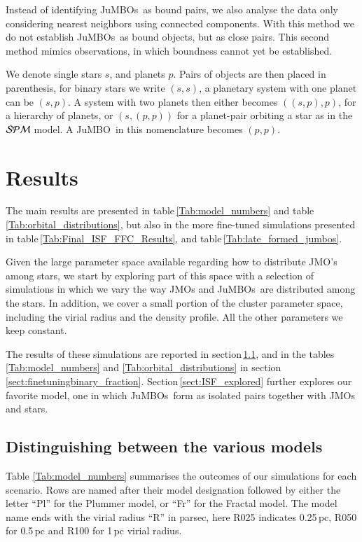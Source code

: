 \documentclass[submission,phys]{lib/SciPost}
\newcommand{\jumbo}{\mbox{JuMBO}}
\newcommand{\jumbos}{\mbox{JuMBOs}}
\begin{document}
Instead of identifying \jumbos\, as bound pairs, we also analyse the
data only considering nearest neighbors using connected components. With
this method we do not establish \jumbos\, as bound objects, but as
close pairs. This second method mimics observations, in which
boundness cannot yet be established.

We denote single stars $s$, and planets $p$. Pairs of objects are then
placed in parenthesis, for binary stars we write $(s,s)$, a planetary
system with one planet can be $(s,p)$.  A system with two planets then
either becomes $((s,p),p)$, for a hierarchy of planets, or $(s,(p,p))$
for a planet-pair orbiting a star as in the ${\cal SPM}$ model. A
\jumbo\, in this nomenclature becomes $(p,p)$.

\section{Results}\label{Sect:Results}

The main results are presented in table\,\ref{Tab:model_numbers} and
table\,\ref{Tab:orbital_distributions}, but also in the more
fine-tuned simulations presented in
table\,\ref{Tab:Final_ISF_FFC_Results}, and
table\,\ref{Tab:late_formed_jumbos}.

Given the large parameter space available regarding how to distribute JMO’s
among stars, we start by exploring part of this space with a selection of 
simulations in which we vary the way JMOs and \jumbos\, are distributed among 
the stars. In addition, we cover a small portion of the cluster parameter
space, including the virial radius and the density profile. All the
other parameters we keep constant.

The results of these simulations are reported in
section\,\ref{sect:model_selection}, and in the
tables\,\ref{Tab:model_numbers} and \ref{Tab:orbital_distributions} in
section\,\ref{sect:finetuningbinary_fraction}. Section\,\ref{sect:ISF_explored}
further explores our favorite model, one in which \jumbos\, form as
isolated pairs together with JMOs and stars.

\subsection{Distinguishing between the various models}\label{sect:model_selection}


Table \ref{Tab:model_numbers} summarises the outcomes of our simulations for each scenario.  Rows are named after
their model designation followed by either the letter ``Pl'' for the
Plummer model, or ``Fr'' for the Fractal model.  The model name ends
with the virial radius ``R'' in parsec, here R025 indicates 0.25\,pc,
R050 for 0.5\,pc and R100 for 1\,pc virial radius.
\end{document}
